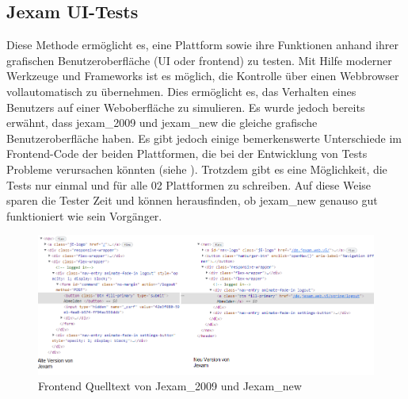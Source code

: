 \subsection{Jexam UI-Tests}

Diese Methode erm\"oglicht es, eine Plattform sowie ihre Funktionen anhand
ihrer grafischen Benutzeroberfl\"ache (\acs{UI} oder \Gls{frontend}) zu
testen. Mit Hilfe moderner Werkzeuge und Frameworks ist es m\"oglich, die
Kontrolle \"uber einen Webbrowser vollautomatisch zu \"ubernehmen. Dies
erm\"oglicht es, das Verhalten eines Benutzers auf einer Weboberfl\"ache zu
simulieren. Es wurde jedoch bereits erw\"ahnt, dass \Gls{jexam_2009} und \Gls{jexam_new}
die gleiche grafische Benutzeroberfl\"ache haben. Es gibt jedoch einige
bemerkenswerte Unterschiede im Frontend-Code der beiden Plattformen,
die bei der Entwicklung von Tests Probleme verursachen k\"onnten
(siehe ). Trotzdem gibt es eine
M\"oglichkeit, die Tests nur einmal und f\"ur alle 02
Plattformen zu schreiben. Auf diese Weise sparen die Tester Zeit und k\"onnen
herausfinden, ob \Gls{jexam_new} genauso gut funktioniert wie sein Vorg\"anger.

\noindent
\begin{figure}
    \centering
    \includegraphics[scale=0.6]{images/jexam_compare}
    \caption{Frontend Quelltext von Jexam\_2009 und Jexam\_new} \label{fig:old_new}
\end{figure}

